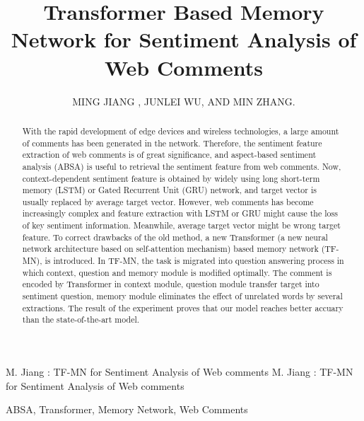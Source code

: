\documentclass{ieeeaccess}
\begin{document}

\title{Transformer Based Memory Network for Sentiment Analysis of Web Comments}
\author{\uppercase{Ming Jiang} ,
\uppercase{Junlei Wu, and MIn Zhang}.}
\address{Xiasha Higher Education Zone, Hangzhou, 310018, Zhejiang Province, People's Republic of China}

\markboth
{M. Jiang \headeretal: TF-MN for Sentiment Analysis of Web comments}
{M. Jiang \headeretal: TF-MN for Sentiment Analysis of Web comments}


\begin{abstract}
With the rapid development of edge devices and wireless technologies, a large amount of comments has been generated in the network. Therefore, the sentiment feature extraction of web comments is of great significance, and aspect-based sentiment analysis (ABSA) is useful to retrieval the sentiment feature from web comments. Now, context-dependent sentiment feature is obtained by widely using long short-term memory (LSTM) or Gated Recurrent Unit (GRU) network, and target vector is usually replaced by average target vector. However, web comments has become increasingly complex and feature extraction with LSTM or GRU might cause the loss of key sentiment information. Meanwhile, average target vector might be wrong target feature. To correct drawbacks of the old method, a new Transformer (a new neural network architecture based on self-attention mechanism) based memory network (TF-MN), is introduced. In TF-MN, the task is migrated into question answering process in which context, question and memory module is modified optimally. The comment is encoded by Transformer in context module, question module transfer target into sentiment question, memory module eliminates the effect of unrelated words by several extractions. The result of the experiment proves that our model reaches better accuary than the state-of-the-art model.
\end{abstract}

\begin{keywords}
ABSA, Transformer, Memory Network, Web Comments

\end{keywords}
\end{document}
